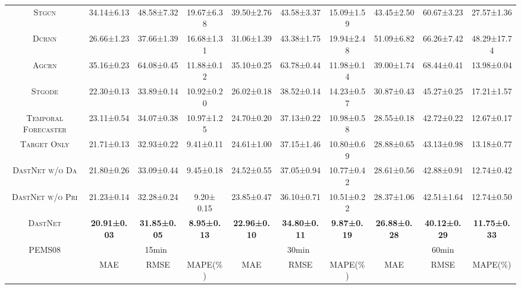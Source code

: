 \documentclass[sigconf]{acmart}
\theoremstyle{definition}
\begin{document}
\begin{table*}[t]
{\begin{tabular}{c||ccc|ccc|ccc}
\textsc{Stgcn}                  & 34.14±6.13  & 48.58±7.32  & 19.67±6.38  & 39.50±2.76  & 43.58±3.37  & 15.09±1.59  & 43.45±2.50  & 60.67±3.23  & 27.57±1.36 \\
\textsc{Dcrnn}                  & 26.66±1.23  & 37.66±1.39  & 16.68±1.31  & 31.06±1.39  & 43.38±1.75  & 19.94±2.48  & 51.09±6.82  & 66.26±7.42  & 48.29±17.74 \\
\textsc{Agcrn}                  & 35.16±0.23  & 64.08±0.45  & 11.88±0.12  & 35.10±0.25  & 63.78±0.44  & 11.98±0.14  & 39.00±1.74  & 68.44±0.41  & 13.98±0.04 \\
\textsc{Stgode}                 & 22.30±0.13  & 33.89±0.14  & 10.92±0.20  & 26.02±0.18  & 38.52±0.14  & 14.23±0.57  & 30.87±0.43  & 45.27±0.25  & 17.21±1.57 \\
\arrayrulecolor{black!30}\midrule
\textsc{Temporal Forecaster}    & 23.11±0.54  & 34.07±0.38  & 10.97±1.25  & 24.70±0.20  & 37.13±0.22  & 10.98±0.58  & 28.55±0.18  & 42.72±0.22  & 12.67±0.17 \\ 
\textsc{Target Only}            & 21.71±0.13  & 32.93±0.22  &  9.41±0.11  & 24.61±1.00  & 37.15±1.46  & 10.80±0.69  & 28.88±0.65  & 43.13±0.98  & 13.18±0.77 \\
\textsc{DastNet  w/o Da}        & 21.80±0.26  & 33.09±0.44  &  9.45±0.18  & 24.52±0.55  & 37.05±0.94  & 10.77±0.42  & 28.61±0.56  & 42.88±0.91  & 12.74±0.42 \\
\textsc{DastNet  w/o Pri}       & 21.23±0.14  & 32.28±0.24  & 9.20± 0.15  & 23.85±0.47  & 36.10±0.71  & 10.51±0.22  & 28.37±1.06  & 42.51±1.64  & 12.74±0.50   \\
\textsc{DastNet}                & \textbf{20.91±0.03}  & \textbf{31.85±0.05}  &  \textbf{8.95±0.13}  & \textbf{22.96±0.10}  & \textbf{34.80±0.11}  &  \textbf{9.87±0.19}  & \textbf{26.88±0.28}  & \textbf{40.12±0.29}  & \textbf{11.75±0.33} \\ \hline\hline
\multirow{2}{*}{PEMS08} 
                       & \multicolumn{3}{c|}{15min}                                                         & \multicolumn{3}{c|}{30min}                                                         & \multicolumn{3}{c}{60min}                                                         \\ \cline{2-10}
                       & \multicolumn{1}{c}{MAE} & \multicolumn{1}{c}{RMSE} & \multicolumn{1}{c|}{MAPE(\%)} & \multicolumn{1}{c}{MAE} & \multicolumn{1}{c}{RMSE} & \multicolumn{1}{c|}{MAPE(\%)} & \multicolumn{1}{c}{MAE} & \multicolumn{1}{c}{RMSE} & \multicolumn{1}{c}{MAPE(\%)} \\ \hline

\end{tabular}}
\end{table*}
\end{document}
